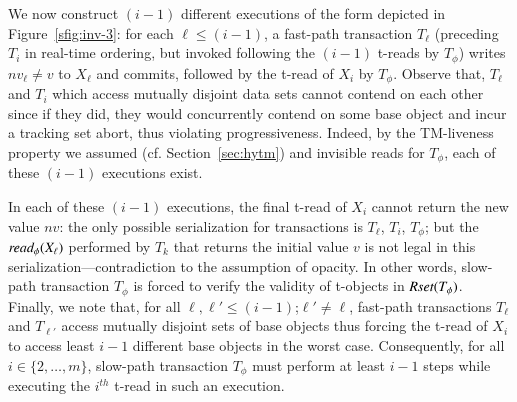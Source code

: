 	We now construct $(i-1)$ different executions of the form depicted in Figure~\ref{sfig:inv-3}: for each $\ell \leq (i-1)$, 
	a fast-path transaction $T_{\ell}$ (preceding $T_i$ in real-time ordering, but invoked following the $(i-1)$ t-reads by $T_{\phi}$) writes $nv_{\ell}\neq v$ to $X_{\ell}$ and commits, followed by
	the t-read of $X_i$ by $T_{\phi}$. Observe that, $T_{\ell}$ and $T_i$ which access mutually disjoint data sets cannot contend on each other since if they did, they would concurrently contend
	on some base object and incur a tracking set abort, thus violating progressiveness.
	Indeed, by the TM-liveness property we assumed (cf. Section~\ref{sec:hytm}) and invisible reads for $T_{\phi}$, each of these $(i-1)$ executions exist. 
	
	In each of these $(i-1)$ executions, the final t-read of $X_i$ cannot return the new value $nv$:
	the only possible serialization for transactions is $T_{\ell}$, $T_i$, $T_{\phi}$; but the $\textit{read}_{\phi}(X_{\ell})$
	performed by $T_k$ that returns the initial value $v$ is not legal in this serialization---contradiction to the assumption of opacity.
	In other words, slow-path transaction $T_{\phi}$ is forced to verify the validity of t-objects in $\textit{Rset}(T_{\phi})$.
	Finally, we note that, for all $\ell, \ell' \leq (i-1)$;$\ell' \neq \ell$, 
	fast-path transactions $T_{\ell}$ and $T_{\ell'}$ access mutually disjoint sets of base objects thus forcing the t-read of $X_i$ to access least $i-1$ different base objects
	in the worst case.
	Consequently, for all $i \in \{2,\ldots, m\}$, slow-path transaction $T_{\phi}$ must perform at least $i-1$ steps 
	while executing the $i^{th}$ t-read in such an execution.
%

